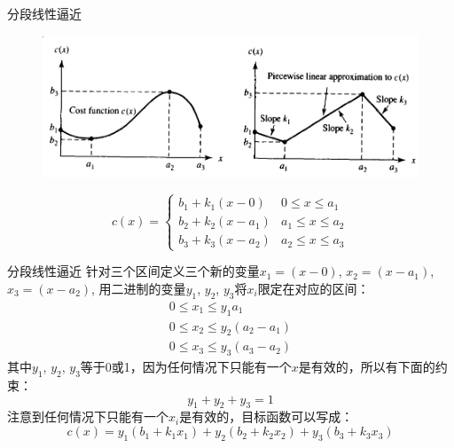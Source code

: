 \documentclass[UTF8]{ctexbeamer}
\begin{document}
\begin{frame}{分段线性逼近}

  \begin{figure}
    \centering
    \includegraphics[width=.8\textwidth{}]{linear.png}
  \end{figure}

  \[
  c(x) =
  \left\{
    \begin{array}{ll}
      b_1 + k_1(x-0) & 0 \le x \le a_1 \\
      b_2 + k_2(x-a_1) & a_1 \le x \le a_2 \\
      b_3 + k_3(x-a_2) & a_2 \le x \le a_3 
    \end{array}
  \right.
  \]
\end{frame}

\begin{frame}{分段线性逼近}
  针对三个区间定义三个新的变量$x_1 = (x-0)$, $x_2 = (x-a_1)$, $x_3 = (x-a_2)$, 用二进制的变量$y_1$, $y_2$, $y_3$将$x_i$限定在对应的区间：
  \[
  \left.
    \begin{array}{l}
      0 \le x_1 \le y_1a_1 \\
      0 \le x_2 \le y_2(a_2 - a_1) \\
      0 \le x_3 \le y_3(a_3 - a_2)
    \end{array}
  \right.
  \]
  其中$y_1$, $y_2$, $y_3$等于0或1，因为任何情况下只能有一个$x$是有效的，所以有下面的约束：
  \[
  y_1 + y_2 + y_3 = 1
  \]
  注意到任何情况下只能有一个$x_i$是有效的，目标函数可以写成：
  \[
  c(x) = y_1(b_1 + k_1x_1) + y_2(b_2 + k_2x_2) + y_3(b_3 + k_3x_3)
  \]
\end{frame}
\end{document}
